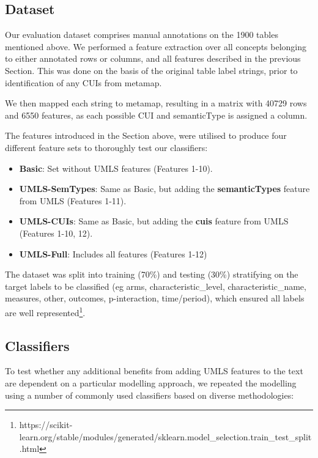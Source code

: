 \documentclass[10.7pt,]{article}
\begin{document}
\subsection{Dataset}

Our evaluation dataset comprises manual annotations on the 1900 tables mentioned above. We performed a feature extraction over all concepts belonging to either annotated rows or columns, and all features described in the previous Section. This was done on the basis of the original table label strings, prior to identification of any CUIs from metamap.

We then mapped each string to metamap, resulting in a matrix with 40729 rows and 6550 features, as each possible CUI and semanticType is assigned a column.

The features introduced in the Section above, were utilised to produce four different feature sets to thoroughly test our classifiers:

\begin{itemize}
	\item \textbf{Basic}: Set without UMLS features (Features 1-10).
	\item \textbf{UMLS-SemTypes}: Same as Basic, but adding the \textbf{semanticTypes} feature from UMLS (Features 1-11).
	\item \textbf{UMLS-CUIs}: Same as Basic, but adding the \textbf{cuis} feature from UMLS (Features 1-10, 12).
	\item \textbf{UMLS-Full}: Includes all features (Features 1-12)
\end{itemize}

The dataset was split into training (70\%) and testing (30\%) stratifying on the target labels to be classified (eg arms, characteristic\_level, characteristic\_name, measures, other, outcomes, p-interaction, time/period), which ensured all labels are well represented\footnote{https://scikit-learn.org/stable/modules/generated/sklearn.model\_selection.train\_test\_split.html}. 



\subsection{Classifiers}
To test whether any additional benefits from adding UMLS features to the text are dependent on a particular modelling approach, we repeated the modelling using a number of commonly used classifiers based on diverse methodologies:
\end{document}
